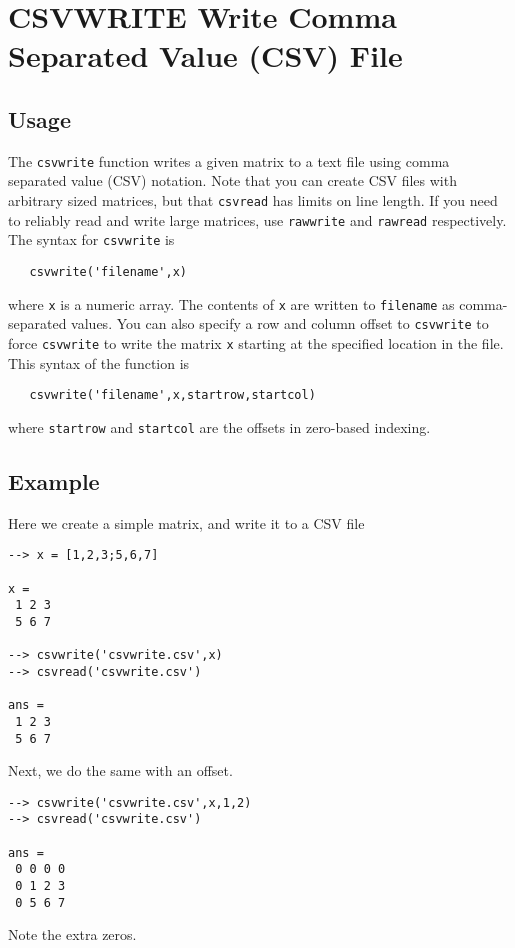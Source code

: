 \section{CSVWRITE Write Comma Separated Value (CSV) File}

\subsection{Usage}

The \verb|csvwrite| function writes a given matrix to a text
file using comma separated value (CSV) notation.  Note that
you can create CSV files with arbitrary sized matrices, but
that \verb|csvread| has limits on line length.  If you need to
reliably read and write large matrices, use \verb|rawwrite| and
\verb|rawread| respectively.  The syntax for \verb|csvwrite| is 
\begin{verbatim}
   csvwrite('filename',x)
\end{verbatim}
where \verb|x| is a numeric array.  The contents of \verb|x| are written
to \verb|filename| as comma-separated values.  You can also specify
a row and column offset to \verb|csvwrite| to force \verb|csvwrite| to
write the matrix \verb|x| starting at the specified location in the 
file.  This syntax of the function is
\begin{verbatim}
   csvwrite('filename',x,startrow,startcol)
\end{verbatim}
where \verb|startrow| and \verb|startcol| are the offsets in zero-based
indexing.  
\subsection{Example}

Here we create a simple matrix, and write it to a CSV file
\begin{verbatim}
--> x = [1,2,3;5,6,7]

x = 
 1 2 3 
 5 6 7 

--> csvwrite('csvwrite.csv',x)
--> csvread('csvwrite.csv')

ans = 
 1 2 3 
 5 6 7 
\end{verbatim}
Next, we do the same with an offset.
\begin{verbatim}
--> csvwrite('csvwrite.csv',x,1,2)
--> csvread('csvwrite.csv')

ans = 
 0 0 0 0 
 0 1 2 3 
 0 5 6 7 
\end{verbatim}
Note the extra zeros.
